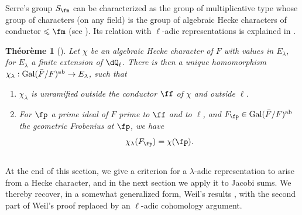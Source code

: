 \documentclass[oneside]{book}
\DeclareMathOperator{\gal}{Gal}
\newcounter{char}
\theoremstyle{sga-source}
\theoremstyle{sga-source-dash}
\theoremstyle{sga-source-dotdash}
\theoremstyle{sga-source-number-note-dash}
\theoremstyle{sga-source-note-number-dotdash}
\theoremstyle{sga-source-example-dotdash}
\theoremstyle{sga-source-inline-number}
\theoremstyle{sga-source-bare-number}
\theoremstyle{sga-source}
\newtheorem{theorem_}[subsection]{Théorème}
\begin{document}
Serre's group $S_\fm$ can be characterized as the 
group of multiplicative type whose group of characters (on any 
field) is the group of algebraic Hecke characters of conductor 
$\leqslant \fm$ (see \cite[II 2.1 et 2.2]{se68}). Its relation with 
$\ell$-adic representations is explained in \cite[II 2.3]{se68}.





\begin{theorem_}[{\cite{se68}}]\label{VI:5-8}
Let $\chi$ be an algebraic Hecke character of $F$ with values in $E_\lambda$, for 
$E_\lambda$ a finite extension of $\dQ_\ell$. There is then a unique 
  homomorphism $\chi_\lambda:\gal(\bar F/F)^\textnormal{ab} \to E_\lambda$, such 
that 
\begin{enumerate}[\indent (i)]
  \item $\chi_\lambda$ is unramified outside the conductor $\ff$ of 
    $\chi$ and outside $\ell$. 
  \item For $\fp$ a prime ideal of $F$ prime to $\ff$ and to $\ell$, 
    and $F_\fp\in \gal(\bar F/F)^\textnormal{ab}$ the geometric Frobenius 
    at $\fp$, we have 
    \[
      \chi_\lambda(F_\fp) = \chi(\fp) \text{.}
    \] 
\end{enumerate}
\end{theorem_}





\subsection{}\label{VI:5-9}

At the end of this section, we give a criterion for a 
$\lambda$-adic representation to arise from a Hecke character, 
and in the next section we apply it to Jacobi sums. We 
thereby recover, in a somewhat generalized form, Weil's results 
\cite{we52,we74-2}, with the second part of Weil's proof 
replaced by an $\ell$-adic cohomology argument. 
\end{document}
